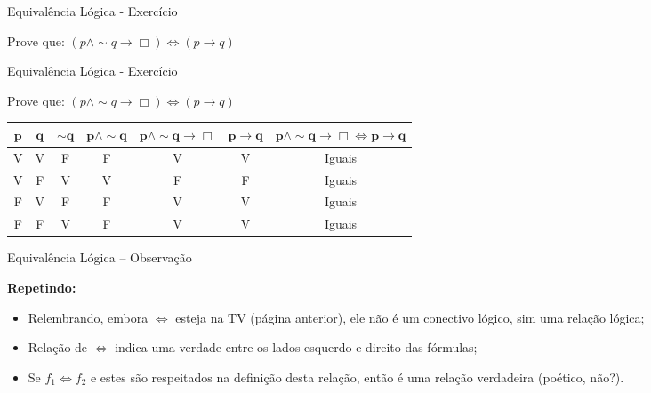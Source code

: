 \begin{frame}[t]{Equivalência Lógica - Exercício} %
	\begin{center}
	Prove que: $(p \wedge \sim q \rightarrow \Box ) \Leftrightarrow (p \rightarrow q)$
	\end{center}
\end{frame}
\begin{frame}[t]{Equivalência Lógica - Exercício} %
	\begin{center}
	Prove que: $(p \wedge \sim q \rightarrow \mathtt{\Box}) \Leftrightarrow (p \rightarrow q)$
	\end{center}

	\begin{center}
	\begin{scriptsize}
	\begin{tabular}{|c|c|c|c|c|c|c|}
	\hline
	$\mathbf{p}$ & $\mathbf{q}$ & $\mathbf{\sim q}$ & $\mathbf{p \wedge\sim q}$ & $\mathbf{p \wedge\sim q \rightarrow\mathtt{\Box}}$ & $\mathbf{p \rightarrow q}$ & $\mathbf{p \wedge\sim q \rightarrow\mathtt{\Box} \Leftrightarrow p \rightarrow q}$\\
	\hline
	V & V & F & F & V & V &  Iguais \\
	\hline
	V & F & V & V & F & F & Iguais \\
	\hline
	F & V & F & F & V & V & Iguais \\
	\hline
	F & F & V & F & V & V & Iguais \\
	\hline
	\end{tabular}
	\end{scriptsize}
	\end{center}
\end{frame}
\begin{frame}[t]{Equivalência Lógica -- Observação} %

{\bf Repetindo:}

\begin{itemize}
\item  Relembrando, embora $\Leftrightarrow $ esteja na TV (página anterior),
ele não é um conectivo lógico, sim uma relação
lógica;

\item Relação de  $\Leftrightarrow $ indica uma verdade entre os lados
esquerdo e direito das fórmulas; 

\item  Se $f_1 \Leftrightarrow f_2 $ e estes são respeitados na
definição desta relação, então é uma relação verdadeira
 (poético, não?).
\end{itemize}

\end{frame}
